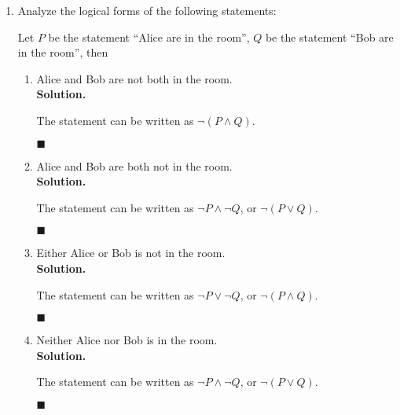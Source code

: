 \documentclass{report}
\newcommand{\sol}{\vspace{1em}\\\textbf{Solution.}\vspace{0.5em}}
\newcommand{\qed}{\ \\\strut\hfill$\blacksquare$\vspace{1em}}
\begin{document}
\begin{enumerate}[leftmargin=*]
\begin{enumerate}
                  \item I'll have either fish or chicken, but I won't have both fish and mashed
                        potatoes. \sol{}

                        Let $P$ be the statement ``I'll have fish'', $Q$ be the statement ``I'll have
                        chicken'', $R$ be the statement ``I'll have mashed potatoes'', then the
                        statement can be written as $(P \vee Q) \wedge \neg(P \wedge R)$. \qed

                  \item 3 is a common divisor of 6,9, and 15.
                        \sol{}

                        Let $P(n)$ be the statement ``3 is a divisor of $n$'', then the statement can
                        be written as $P(6) \wedge P(9) \wedge P(15)$. \qed
            \end{enumerate}

      \item  Analyze the logical forms of the following statements:

            Let $P$ be the statement ``Alice are in the room'', $Q$ be the statement ``Bob
            are in the room'', then
            \begin{enumerate}
                  \item Alice and Bob are not both in the room. \sol{}

                        The statement can be written as $\neg(P \wedge Q)$. \qed

                  \item Alice and Bob are both not in the room. \sol{}

                        The statement can be written as $\neg P \wedge \neg Q$, or $\neg(P \vee Q)$.
                        \qed

                  \item Either Alice or Bob is not in the room. \sol{}

                        The statement can be written as $\neg P \vee \neg Q$, or $\neg(P \wedge Q)$.
                        \qed

                  \item Neither Alice nor Bob is in the room. \sol{}

                        The statement can be written as $\neg P \wedge \neg Q$, or $\neg(P \vee Q)$.
                        \qed
            \end{enumerate}


\end{enumerate}
\end{document}

